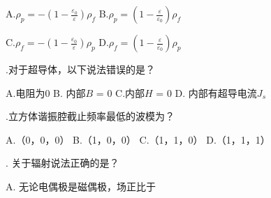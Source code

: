 A.\hspace{0.8em}$\rho_p = - (1 - \displaystyle{ \frac{\varepsilon_0}{\varepsilon} } )\rho_f $\hspace{5em}
B.\hspace{0.8em}$\rho_p =  (1 - \displaystyle{ \frac{\varepsilon}{\varepsilon_0} } )\rho_f $\vspace{0.4cm}

C.\hspace{0.8em}$\rho_f = - (1 - \displaystyle{ \frac{\varepsilon_0}{\varepsilon} } )\rho_p $\hspace{5em}
D.\hspace{0.8em}$\rho_f =  (1 - \displaystyle{ \frac{\varepsilon}{\varepsilon_0} } )\rho_p $\vspace{0.3cm}

.\hspace{0.8em}对于超导体，以下说法错误的是？\vspace{0.2cm}

A.\hspace{0.8em}电阻为0 \hspace{2em} B.\hspace{0.8em} 内部$B$ = 0 \hspace{2em} C.\hspace{0.8em}内部$H$ = 0  \hspace{2em} D.\hspace{0.8em} 内部有超导电流$J_s$
\vspace{0.2cm}

.\hspace{0.8em}立方体谐振腔截止频率最低的波模为？
\vspace{0.2cm}

A.\hspace{0.8em}（0，0，0）\hspace{2em} B.\hspace{0.8em}（1，0，0）\hspace{2em} C.\hspace{0.8em}（1，1，0）\hspace{2em} D.\hspace{0.8em}（1，1，1）\vspace{0.2cm}

.\hspace{0.8em}
关于辐射说法正确的是？
\vspace{0.2cm}

A.\hspace{0.8em}
无论电偶极是磁偶极，场正比于
\vspace{0.2cm}

